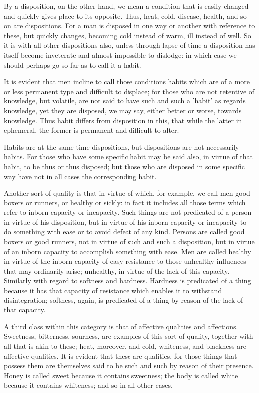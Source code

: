 By a disposition, on the other hand, we mean a condition that is easily
changed and quickly gives place to its opposite. Thus, heat, cold,
disease, health, and so on are dispositions. For a man is disposed in
one way or another with reference to these, but quickly changes,
becoming cold instead of warm, ill instead of well. So it is with all
other dispositions also, unless through lapse of time a disposition has
itself become inveterate and almost impossible to dislodge: in which
case we should perhaps go so far as to call it a habit.

It is evident that men incline to call those conditions habits which
are of a more or less permanent type and difficult to displace; for
those who are not retentive of knowledge, but volatile, are not said to
have such and such a 'habit' as regards knowledge, yet they are
disposed, we may say, either better or worse, towards knowledge. Thus
habit differs from disposition in this, that while the latter in
ephemeral, the former is permanent and difficult to alter.

Habits are at the same time dispositions, but dispositions are not
necessarily habits. For those who have some specific habit may be said
also, in virtue of that habit, to be thus or thus disposed; but those
who are disposed in some specific way have not in all cases the
corresponding habit.

Another sort of quality is that in virtue of which, for example, we
call men good boxers or runners, or healthy or sickly: in fact it
includes all those terms which refer to inborn capacity or incapacity.
Such things are not predicated of a person in virtue of his
disposition, but in virtue of his inborn capacity or incapacity to do
something with ease or to avoid defeat of any kind. Persons are called
good boxers or good runners, not in virtue of such and such a
disposition, but in virtue of an inborn capacity to accomplish
something with ease. Men are called healthy in virtue of the inborn
capacity of easy resistance to those unhealthy influences that may
ordinarily arise; unhealthy, in virtue of the lack of this capacity.
Similarly with regard to softness and hardness. Hardness is predicated
of a thing because it has that capacity of resistance which enables it
to withstand disintegration; softness, again, is predicated of a thing
by reason of the lack of that capacity.

A third class within this category is that of affective qualities and
affections. Sweetness, bitterness, sourness, are examples of this sort
of quality, together with all that is akin to these; heat, moreover,
and cold, whiteness, and blackness are affective qualities. It is
evident that these are qualities, for those things that possess them
are themselves said to be such and such by reason of their presence.
Honey is called sweet because it contains sweetness; the body is called
white because it contains whiteness; and so in all other cases.

